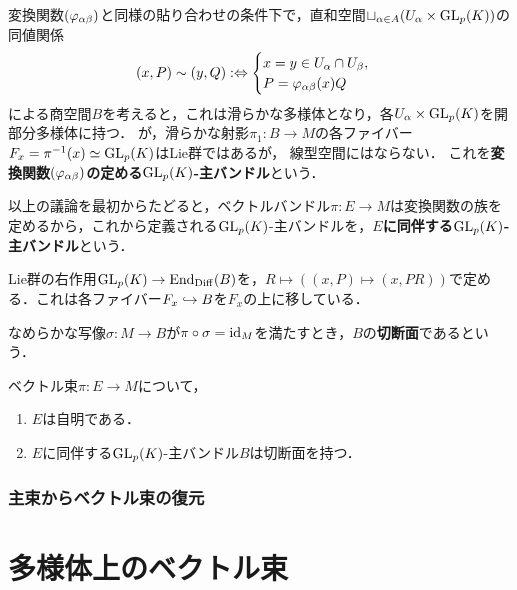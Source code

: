\documentclass[uplatex,dvipdfmx]{jsreport}
\begin{document}
\begin{definition}\label{def-principle-budle}
    変換関数$(\varphi_{\alpha\beta})$と同様の貼り合わせの条件下で，直和空間$\sqcup_{\alpha\in A}(U_\alpha\times\mathrm{GL}_p(K))$の同値関係
    \[(x,P)\sim(y,Q):\Leftrightarrow\begin{cases}
        x=y\in U_\alpha\cap U_\beta,\\
        P=\varphi_{\alpha\beta}(x)Q
    \end{cases}\]
    による商空間$B$を考えると，これは滑らかな多様体となり，各$U_\alpha\times\mathrm{GL}_p(K)$を開部分多様体に持つ．
    が，滑らかな射影$\pi_1:B\to M$の各ファイバー$F_x=\pi^{-1}(x)\simeq\mathrm{GL}_p(K)$はLie群ではあるが，
    線型空間にはならない．
    これを\textbf{変換関数$(\varphi_{\alpha\beta})$の定める$\mathrm{GL}_p(K)$-主バンドル}という．
\end{definition}
\begin{remark}
    以上の議論を最初からたどると，ベクトルバンドル$\pi:E\to M$は変換関数の族を定めるから，これから定義される$\mathrm{GL}_p(K)$-主バンドルを，\textbf{$E$に同伴する$\mathrm{GL}_p(K)$-主バンドル}という．
\end{remark}

\begin{definition}
    Lie群の右作用$\mathrm{GL}_p(K)\to\mathrm{End}_{\mathrm{Diff}}(B)$を，$R\mapsto ((x,P)\mapsto(x,PR))$で定める．これは各ファイバー$F_x\hookrightarrow B$を$F_x$の上に移している．
\end{definition}

\begin{definition}[section]
    なめらかな写像$\sigma:M\to B$が$\pi\circ\sigma=\mathrm{id}_M$を満たすとき，$B$の\textbf{切断面}であるという．
\end{definition}

\begin{theorem}
    ベクトル束$\pi:E\to M$について，
    \begin{enumerate}
        \item $E$は自明である．
        \item $E$に同伴する$\mathrm{GL}_p(K)$-主バンドル$B$は切断面を持つ．
    \end{enumerate}
\end{theorem}

\subsection{主束からベクトル束の復元}



\chapter{多様体上のベクトル束}
\end{document}
